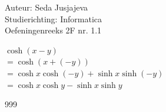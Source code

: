 \documentclass[a4paper]{article}
\begin{document}
\noindent \large Auteur: Seda Jusjajeva\\
\noindent \large Studierichting: Informatica\\
\noindent \large Oefeningenreeks 2F nr. 1.1 \\

\medskip

\normalsize


$\cosh(x - y)$ \\

$= \cosh(x + (-y))$ \\

$= \cosh x\cosh(-y) + \sinh x\sinh(-y)$ \\

$= \cosh x\cosh y - \sinh x\sinh y$ \\



\begin{thebibliography}{999}
\end{thebibliography}
\end{document}
